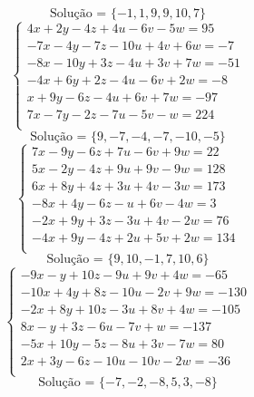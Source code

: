 \documentclass[12pt,oneside,a4paper]{article}
\begin{document}
\begin{equation*}
\text{Solução = }\{-1,1,9,9,10,7\}
\end{equation*}
\vspace{\baselineskip}
\begin{equation*}
\begin{cases}
4x+2y-4z+4u-6v-5w=95 \\
-7x-4y-7z-10u+4v+6w=-7 \\
-8x-10y+3z-4u+3v+7w=-51 \\
-4x+6y+2z-4u-6v+2w=-8 \\
x+9y-6z-4u+6v+7w=-97 \\
7x-7y-2z-7u-5v-w=224 \\
\end{cases}
\end{equation*}
\begin{equation*}
\text{Solução = }\{9,-7,-4,-7,-10,-5\}
\end{equation*}
\vspace{\baselineskip}
\begin{equation*}
\begin{cases}
7x-9y-6z+7u-6v+9w=22 \\
5x-2y-4z+9u+9v-9w=128 \\
6x+8y+4z+3u+4v-3w=173 \\
-8x+4y-6z-u+6v-4w=3 \\
-2x+9y+3z-3u+4v-2w=76 \\
-4x+9y-4z+2u+5v+2w=134 \\
\end{cases}
\end{equation*}
\begin{equation*}
\text{Solução = }\{9,10,-1,7,10,6\}
\end{equation*}
\vspace{\baselineskip}
\begin{equation*}
\begin{cases}
-9x-y+10z-9u+9v+4w=-65 \\
-10x+4y+8z-10u-2v+9w=-130 \\
-2x+8y+10z-3u+8v+4w=-105 \\
8x-y+3z-6u-7v+w=-137 \\
-5x+10y-5z-8u+3v-7w=80 \\
2x+3y-6z-10u-10v-2w=-36 \\
\end{cases}
\end{equation*}
\begin{equation*}
\text{Solução = }\{-7,-2,-8,5,3,-8\}
\end{equation*}
\end{document}
